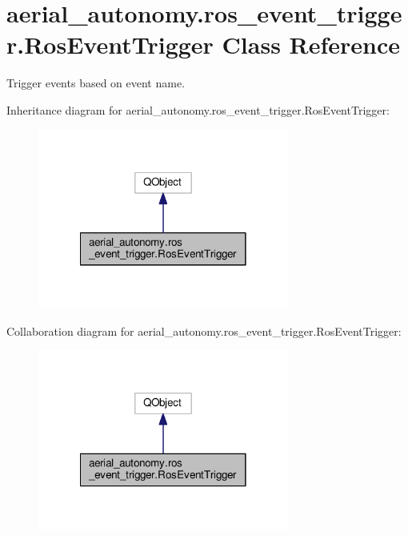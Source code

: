 \hypertarget{classaerial__autonomy_1_1ros__event__trigger_1_1RosEventTrigger}{\section{aerial\-\_\-autonomy.\-ros\-\_\-event\-\_\-trigger.\-Ros\-Event\-Trigger Class Reference}
\label{classaerial__autonomy_1_1ros__event__trigger_1_1RosEventTrigger}
}


Trigger events based on event name.  




Inheritance diagram for aerial\-\_\-autonomy.\-ros\-\_\-event\-\_\-trigger.\-Ros\-Event\-Trigger\-:\nopagebreak
\begin{figure}[H]
\begin{center}
\leavevmode
\includegraphics[width=234pt]{classaerial__autonomy_1_1ros__event__trigger_1_1RosEventTrigger__inherit__graph}
\end{center}
\end{figure}


Collaboration diagram for aerial\-\_\-autonomy.\-ros\-\_\-event\-\_\-trigger.\-Ros\-Event\-Trigger\-:\nopagebreak
\begin{figure}[H]
\begin{center}
\leavevmode
\includegraphics[width=234pt]{classaerial__autonomy_1_1ros__event__trigger_1_1RosEventTrigger__coll__graph}
\end{center}
\end{figure}
